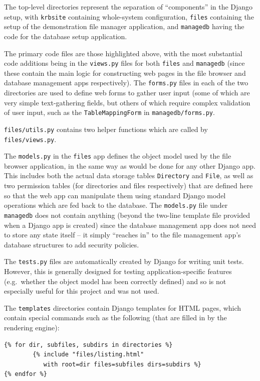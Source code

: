 \documentclass[12pt]{report}
\begin{document}
The top-level directories represent the separation of ``components'' in the Django setup, with \texttt{krbsite} containing whole-system configuration, \texttt{files} containing the setup of the demonstration file manager application, and \texttt{managedb} having the code for the database setup application.

The primary code files are those highlighted above, with the most substantial code additions being in the \texttt{views.py} files for both \texttt{files} and \texttt{managedb} (since these contain the main logic for constructing web pages in the file browser and database management apps respectively). The \texttt{forms.py} files in each of the two directories are used to define web forms to gather user input (some of which are very simple text-gathering fields, but others of which require complex validation of user input, such as the \texttt{TableMappingForm} in \texttt{managedb/forms.py}.

\texttt{files/utils.py} contains two helper functions which are called by \texttt{files/views.py}.

The \texttt{models.py} in the \texttt{files} app defines the object model used by the file browser application, in the same way as would be done for any other Django app. This includes both the actual data storage tables \texttt{Directory} and \texttt{File}, as well as two permission tables (for directories and files respectively) that are defined here so that the web app can manipulate them using standard Django model operations which are fed back to the database. The \texttt{models.py} file under \texttt{managedb} does not contain anything (beyond the two-line template file provided when a Django app is created) since the database management app does not need to store any state itself -- it simply ``reaches in'' to the file management app's database structures to add security policies.

The \texttt{tests.py} files are automatically created by Django for writing unit tests. However, this is generally designed for testing application-specific features (e.g.\ whether the object model has been correctly defined) and so is not especially useful for this project and was not used.

The \texttt{templates} directories contain Django templates for HTML pages, which contain special commands such as the following (that are filled in by the rendering engine):

\begin{verbatim}
{% for dir, subfiles, subdirs in directories %}
        {% include "files/listing.html"
           with root=dir files=subfiles dirs=subdirs %}
{% endfor %}
\end{verbatim}
\end{document}
